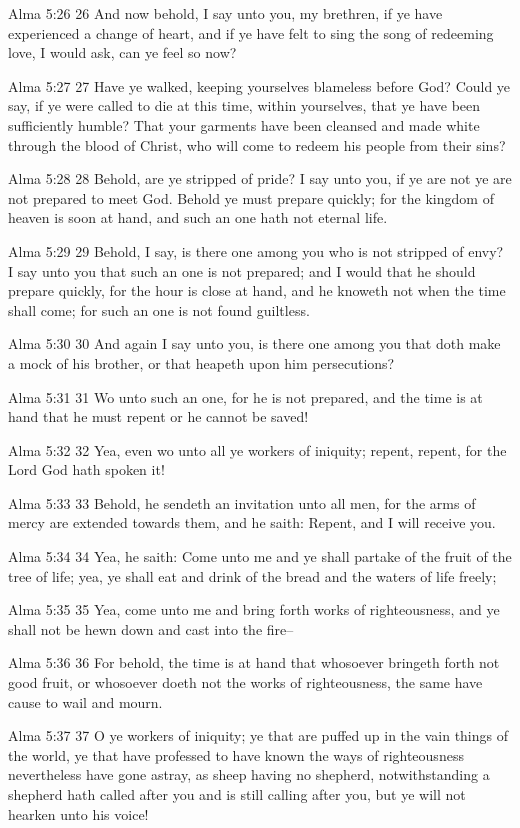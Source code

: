 Alma 5:26
 26 And now behold, I say unto you, my brethren, if ye have
experienced a change of heart, and if ye have felt to sing the
song of redeeming love, I would ask, can ye feel so now?

Alma 5:27
 27 Have ye walked, keeping yourselves blameless before God?
Could ye say, if ye were called to die at this time, within
yourselves, that ye have been sufficiently humble? That your
garments have been cleansed and made white through the blood of
Christ, who will come to redeem his people from their sins?

Alma 5:28
 28 Behold, are ye stripped of pride? I say unto you, if ye are
not ye are not prepared to meet God. Behold ye must prepare
quickly; for the kingdom of heaven is soon at hand, and such an
one hath not eternal life.

Alma 5:29
 29 Behold, I say, is there one among you who is not stripped of
envy? I say unto you that such an one is not prepared; and I
would that he should prepare quickly, for the hour is close at
hand, and he knoweth not when the time shall come; for such an
one is not found guiltless.

Alma 5:30
 30 And again I say unto you, is there one among you that doth
make a mock of his brother, or that heapeth upon him
persecutions?

Alma 5:31
 31 Wo unto such an one, for he is not prepared, and the time is
at hand that he must repent or he cannot be saved!

Alma 5:32
 32 Yea, even wo unto all ye workers of iniquity; repent, repent,
for the Lord God hath spoken it!

Alma 5:33
 33 Behold, he sendeth an invitation unto all men, for the arms
of mercy are extended towards them, and he saith: Repent, and I
will receive you.

Alma 5:34
 34 Yea, he saith: Come unto me and ye shall partake of the fruit
of the tree of life; yea, ye shall eat and drink of the bread and
the waters of life freely;

Alma 5:35
 35 Yea, come unto me and bring forth works of righteousness, and
ye shall not be hewn down and cast into the fire--

Alma 5:36
 36 For behold, the time is at hand that whosoever bringeth forth
not good fruit, or whosoever doeth not the works of
righteousness, the same have cause to wail and mourn.

Alma 5:37
 37 O ye workers of iniquity; ye that are puffed up in the vain
things of the world, ye that have professed to have known the
ways of righteousness nevertheless have gone astray, as sheep
having no shepherd, notwithstanding a shepherd hath called after
you and is still calling after you, but ye will not hearken unto
his voice!

